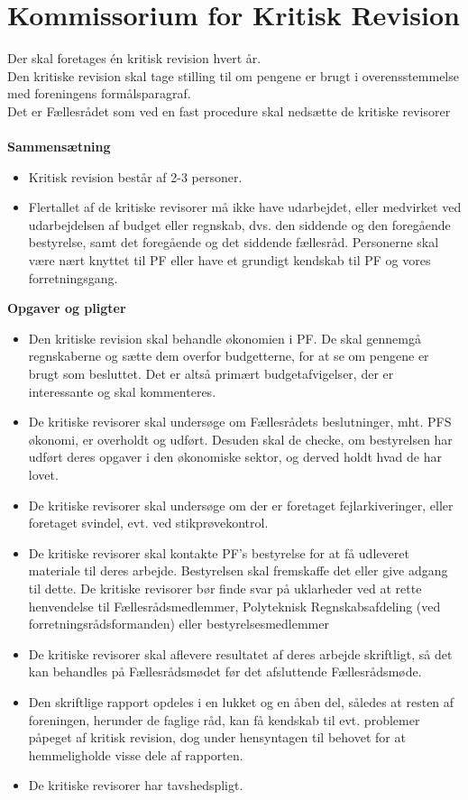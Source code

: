 \section{Kommissorium for Kritisk Revision}

Der skal foretages én kritisk revision hvert år.\\
Den kritiske revision skal tage stilling til om pengene er brugt i overensstemmelse med foreningens formålsparagraf.\\
Det er Fællesrådet som ved en fast procedure skal nedsætte de kritiske revisorer\\
\\
\textbf{Sammensætning}
\begin{itemize}
\item Kritisk revision består af 2-3 personer.
\item Flertallet af de kritiske revisorer må ikke have udarbejdet, eller medvirket ved udarbejdelsen af budget eller regnskab, dvs. den siddende og den foregående bestyrelse, samt det foregående og det siddende fællesråd. Personerne skal være nært knyttet til PF eller have et grundigt kendskab til PF og vores forretningsgang.
\end{itemize}
\textbf{Opgaver og pligter}
\begin{itemize}
\item Den kritiske revision skal behandle økonomien i PF. De skal gennemgå regnskaberne og sætte dem overfor
budgetterne, for at se om pengene er brugt som besluttet. Det er altså primært budgetafvigelser, der er
interessante og skal kommenteres.
\item De kritiske revisorer skal undersøge om Fællesrådets beslutninger, mht. PFS økonomi, er overholdt og udført.
Desuden skal de checke, om bestyrelsen har udført deres opgaver i den økonomiske sektor, og derved holdt
hvad de har lovet.
\item De kritiske revisorer skal undersøge om der er foretaget fejlarkiveringer, eller foretaget svindel, evt. ved
stikprøvekontrol.
\item De kritiske revisorer skal kontakte PF's bestyrelse for at få udleveret materiale til deres arbejde. Bestyrelsen
skal fremskaffe det eller give adgang til dette. De kritiske revisorer bør finde svar på uklarheder ved at rette
henvendelse til Fællesrådsmedlemmer, Polyteknisk Regnskabsafdeling (ved forretningsrådsformanden) eller
bestyrelsesmedlemmer
\item De kritiske revisorer skal aflevere resultatet af deres arbejde skriftligt, så det kan behandles på
Fællesrådsmødet før det afsluttende Fællesrådsmøde.
\item Den skriftlige rapport opdeles i en lukket og en åben del, således at resten af foreningen, herunder de faglige
råd, kan få kendskab til evt. problemer påpeget af kritisk revision, dog under hensyntagen til behovet for at
hemmeligholde visse dele af rapporten.
\item De kritiske revisorer har tavshedspligt.
\end{itemize}
